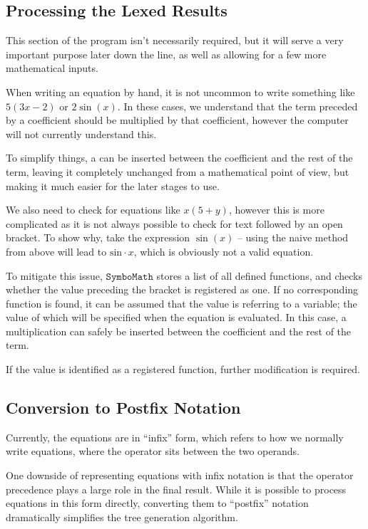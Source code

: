 \documentclass[12pt]{article}
\def\Symbo{{$\texttt{SymboMath}$}}
\begin{document}
\subsection{Processing the Lexed Results}

This section of the program isn't necessarily required, but it will serve a very important purpose later down the line, as well as allowing for a few more mathematical inputs.

When writing an equation by hand, it is not uncommon to write something like $5(3x-2)$ or $2\sin(x)$. In these cases, we understand that the term preceded by a coefficient should be multiplied by that coefficient, however the computer will not currently understand this.

To simplify things, a  can be inserted between the coefficient and the rest of the term, leaving it completely unchanged from a mathematical point of view, but making it much easier for the later stages to use.

We also need to check for equations like $x(5+y)$, however this is more complicated as it is not always possible to check for text followed by an open bracket. To show why, take the expression $\sin(x)$ -- using the naive method from above will lead to $\text{sin} \cdot x$, which is obviously not a valid equation.

To mitigate this issue, \Symbo{} stores a list of all defined functions, and checks whether the value preceding the bracket is registered as one. If no corresponding function is found, it can be assumed that the value is referring to a variable; the value of which will be specified when the equation is evaluated. In this case, a multiplication can safely be inserted between the coefficient and the rest of the term. 

If the value is identified as a registered function, further modification is required.

\subsection{Conversion to Postfix Notation}

Currently, the equations are in ``infix'' form, which refers to how we normally write equations, where the operator sits between the two operands.

One downside of representing equations with infix notation is that the operator precedence plays a large role in the final result. While it is possible to process equations in this form directly, converting them to ``postfix'' notation dramatically simplifies the tree generation algorithm.
\end{document}
